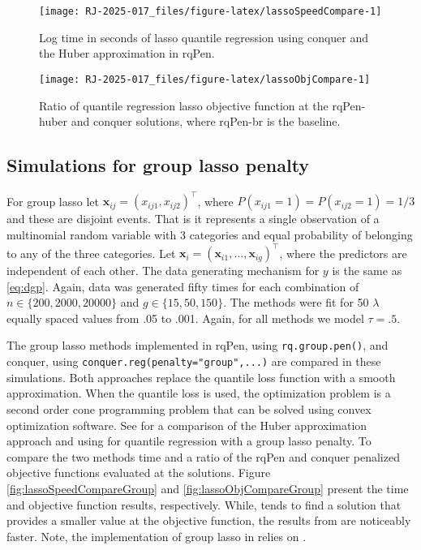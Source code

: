 \begin{figure}

{\centering \texttt{[image: RJ-2025-017\_files/figure-latex/lassoSpeedCompare-1]} 

}

\caption{Log time in seconds of lasso quantile regression using conquer and the Huber approximation in rqPen.}\label{fig:lassoSpeedCompare}
\end{figure}

\begin{figure}

{\centering \texttt{[image: RJ-2025-017\_files/figure-latex/lassoObjCompare-1]} 

}

\caption{Ratio of quantile regression lasso objective function at the rqPen-huber and conquer solutions, where rqPen-br is the baseline.}\label{fig:lassoObjCompare}
\end{figure}

\subsection{Simulations for group lasso penalty}\label{simulations-for-group-lasso-penalty}

For group lasso let \(\mathbf{x}_{ij}=(x_{ij1},x_{ij2})^\top\), where \(P(x_{ij1}=1)=P(x_{ij2}=1)=1/3\) and these are disjoint events. That is it represents a single observation of a multinomial random variable with 3 categories and equal probability of belonging to any of the three categories. Let \(\mathbf{x}_i = (\mathbf{x}_{i1},\ldots,\mathbf{x}_{ig})^\top\), where the predictors are independent of each other. The data generating mechanism for \(y\) is the same as \eqref{eq:dgp}. Again, data was generated fifty times for each combination of \(n \in \{200,2000,20000\}\) and \(g \in \{15,50,150\}\). The methods were fit for 50 \(\lambda\) equally spaced values from .05 to .001. Again, for all methods we model \(\tau=.5\).

The group lasso methods implemented in rqPen, using \texttt{rq.group.pen()}, and conquer, using \texttt{conquer.reg(penalty="group",...)} are compared in these simulations. Both approaches replace the quantile loss function with a smooth approximation. When the quantile loss is used, the optimization problem is a second order cone programming problem that can be solved using convex optimization software. See \citet{SherwoodLi2022} for a comparison of the Huber approximation approach and using  for quantile regression with a group lasso penalty. To compare the two methods time and a ratio of the rqPen and conquer penalized objective functions evaluated at the solutions. Figure \ref{fig:lassoSpeedCompareGroup} and \ref{fig:lassoObjCompareGroup} present the time and objective function results, respectively. While,  tends to find a solution that provides a smaller value at the objective function, the results from  are noticeably faster. Note, the implementation of group lasso in  relies on .

